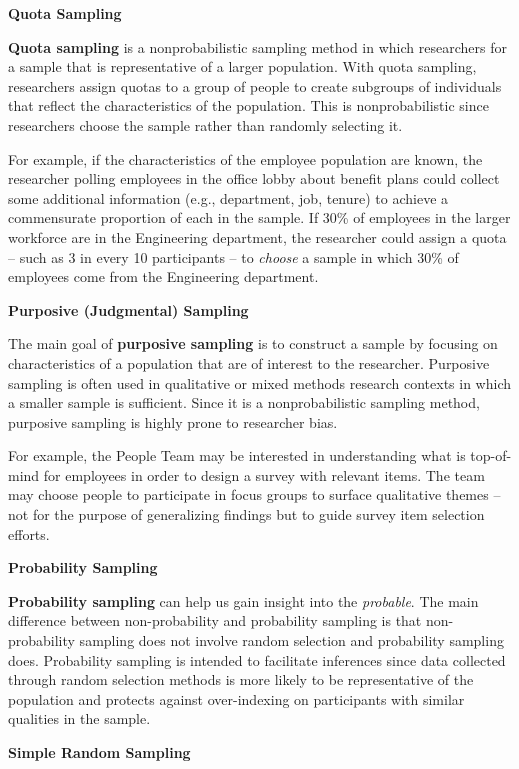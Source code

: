 \documentclass[
]{book}
\begin{document}
\textbf{Quota Sampling}

\textbf{Quota sampling} is a nonprobabilistic sampling method in which researchers for a sample that is representative of a larger population. With quota sampling, researchers assign quotas to a group of people to create subgroups of individuals that reflect the characteristics of the population. This is nonprobabilistic since researchers choose the sample rather than randomly selecting it.

For example, if the characteristics of the employee population are known, the researcher polling employees in the office lobby about benefit plans could collect some additional information (e.g., department, job, tenure) to achieve a commensurate proportion of each in the sample. If 30\% of employees in the larger workforce are in the Engineering department, the researcher could assign a quota -- such as 3 in every 10 participants -- to \emph{choose} a sample in which 30\% of employees come from the Engineering department.

\textbf{Purposive (Judgmental) Sampling}

The main goal of \textbf{purposive sampling} is to construct a sample by focusing on characteristics of a population that are of interest to the researcher. Purposive sampling is often used in qualitative or mixed methods research contexts in which a smaller sample is sufficient. Since it is a nonprobabilistic sampling method, purposive sampling is highly prone to researcher bias.

For example, the People Team may be interested in understanding what is top-of-mind for employees in order to design a survey with relevant items. The team may choose people to participate in focus groups to surface qualitative themes -- not for the purpose of generalizing findings but to guide survey item selection efforts.

\textbf{Probability Sampling}

\textbf{Probability sampling} can help us gain insight into the \emph{probable}. The main difference between non-probability and probability sampling is that non-probability sampling does not involve random selection and probability sampling does. Probability sampling is intended to facilitate inferences since data collected through random selection methods is more likely to be representative of the population and protects against over-indexing on participants with similar qualities in the sample.

\textbf{Simple Random Sampling}
\end{document}

